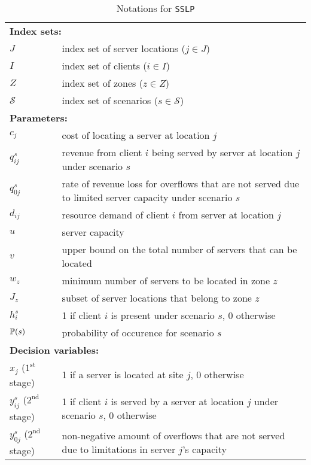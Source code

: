 \begin{table}[H]
	\caption{Notations for \texttt{SSLP}}
	\label{sslp:notation}
	\resizebox{\textwidth}{!}
	{
		\begin{tabular}{ll}
			\toprule
			\multicolumn{2}{l}{\textbf{Index sets:}} \\
			$J$ 		  & index set of server locations ($j\in J$)\\ 
			$I$ 		  & index set of clients ($i\in I$)  \\ 
			$Z$ 		  & index set of zones ($z\in Z$) \\
			$\mathcal{S}$ & index set of scenarios ($s\in \mathcal{S}$)	\\ \midrule
			\multicolumn{2}{l}{\textbf{Parameters:}} \\
			$c_j$		& cost of locating a server at location $j$	\\
			$q_{ij}^s$	& revenue from client $i$ being served by server at location $j$ under scenario $s$	\\
			$q_{0j}^s$	& rate of revenue loss for overflows that are not served due to limited server capacity under scenario $s$	\\
			$d_{ij}$	& resource demand of client $i$ from server at location $j$	\\
			$u$			& server capacity	\\
			$v$			& upper bound on the total number of servers that can be located	\\
			$w_z$		& minimum number of servers to be located in zone $z$	\\
			$J_z$		& subset of server locations that belong to zone $z$	\\
			$h_i^s$		& 1 if client $i$ is present under scenario $s$, 0 otherwise	\\
			$\operatorname*{\mathbb{P}}(s)$ 	& probability of occurence for scenario $s$\\ \midrule
			\multicolumn{2}{l}{\textbf{Decision variables:}} \\
			$x_j$ ($1^{\textrm{st}}$ stage)  	 & 1 if a server is located at site $j$, 0 otherwise \\
			$y_{ij}^s$ ($2^{\textrm{nd}}$ stage) & 1 if client $i$ is served by a server at location $j$ under scenario $s$, 0 otherwise\\
			$y_{0j}^s$ ($2^{\textrm{nd}}$ stage) & non-negative amount of overflows that are not served due to limitations in server $j$'s capacity	\\
			\bottomrule
		\end{tabular}
	}
\end{table} 

